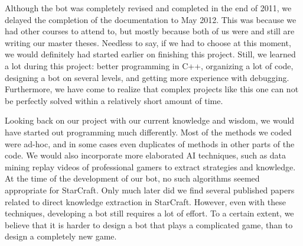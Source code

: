 Although the bot was completely revised and completed in the end of 2011, we delayed the completion of the documentation to May 2012. This was because we had other courses to attend to, but mostly because both of us were and still are writing our master theses. Needless to say, if we had to choose at this moment, we would definitely had started earlier on finishing this project. Still, we learned a lot during this project: better programming in C++, organizing a lot of code, designing a bot on several levels, and getting more experience with debugging. Furthermore, we have come to realize that complex projects like this one can not be perfectly solved within a relatively short amount of time.

Looking back on our project with our current knowledge and wisdom, we would have started out programming much differently. Most of the methods we coded were ad-hoc, and in some cases even duplicates of methods in other parts of the code. We would also incorporate more elaborated AI techniques, such as data mining replay videos of professional gamers to extract strategies and knowledge. At the time of the development of our bot, no such algorithms seemed appropriate for StarCraft. Only much later did we find several published papers related to direct knowledge extraction in StarCraft. However, even with these techniques, developing a bot still requires a lot of effort. To a certain extent, we believe that it is harder to design a bot that plays a complicated game, than to design a completely new game.







%

